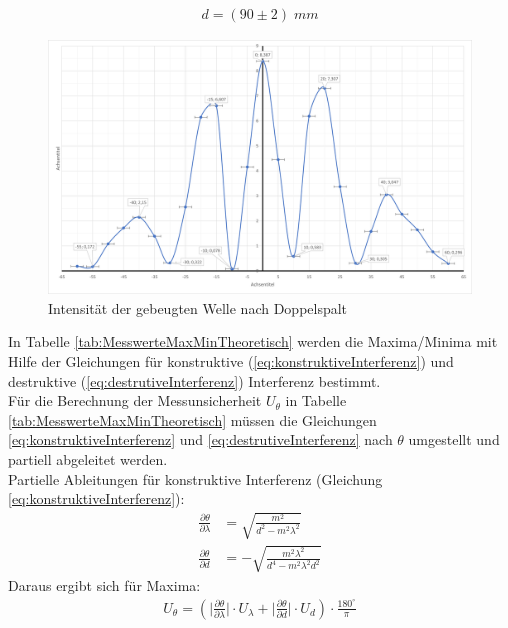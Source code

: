 \documentclass[a4paper]{scrartcl}
\numberwithin{equation}{subsection}
\begin{document}
\begin{align*}
d = (90\pm 2)\; mm
\end{align*}

\begin{figure}[H]
\includegraphics[width=13cm]{Diagramm_Doppelspalt}
\centering
\caption{Intensität der gebeugten Welle nach Doppelspalt}
\centering
\label{fig:DiagrammDoppelspalt}
\end{figure}

In Tabelle \ref{tab:MesswerteMaxMinTheoretisch} werden die Maxima/Minima mit Hilfe der Gleichungen für konstruktive (\ref{eq:konstruktiveInterferenz}) und destruktive (\ref{eq:destrutiveInterferenz}) Interferenz bestimmt.\\
Für die Berechnung der Messunsicherheit $U_{\theta}$ in Tabelle \ref{tab:MesswerteMaxMinTheoretisch} müssen die Gleichungen \ref{eq:konstruktiveInterferenz} und \ref{eq:destrutiveInterferenz} nach $\theta$ umgestellt und partiell abgeleitet werden.\\
Partielle Ableitungen für konstruktive Interferenz (Gleichung \ref{eq:konstruktiveInterferenz}):
\begin{align}
\frac{\partial \theta}{\partial \lambda} &= \sqrt{\frac{m^2}{d^2-m^2\lambda^2}}\\
\frac{\partial \theta}{\partial d} &= - \sqrt{\frac{m^2 \lambda^2}{d^4-m^2\lambda^2d^2}}
\end{align}
Daraus ergibt sich für Maxima:
\begin{align}
U_{\theta} = (\bigg | \frac{\partial \theta}{\partial \lambda} \bigg | \cdot U_{\lambda} + \bigg | \frac{\partial \theta}{\partial d} \bigg | \cdot U_d) \cdot \frac{180 ^\circ}{\pi}
\end{align}
\end{document}

